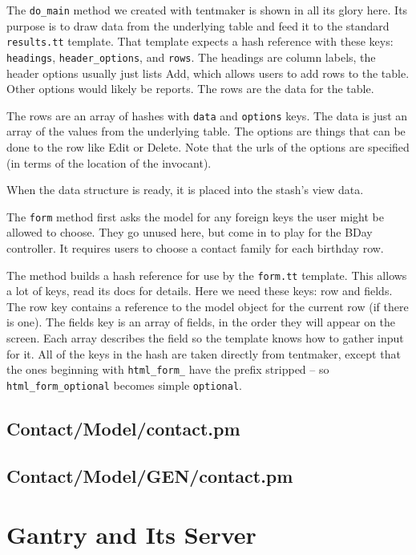 The \verb+do_main+ method we created with tentmaker is shown in all its
glory here.  Its purpose is to draw data from the underlying table
and feed it to the standard \verb+results.tt+ template.  That template expects
a hash reference with these keys: \verb+headings+, \verb+header_options+,
and \verb+rows+.  The headings are column labels, the header options usually
just lists Add, which allows users to add rows to the table.  Other options
would likely be reports.  The rows are the data for the table.

The rows are an array of hashes with \verb+data+ and \verb+options+ keys.
The data is just an array of the values from the underlying table.  The
options are things that can be done to the row like Edit or Delete.
Note that the urls of the options are specified (in terms of the location
of the invocant).

When the data structure is ready, it is placed into the stash's view data.

The \verb+form+ method first asks the model for any foreign keys the
user might be allowed to choose.  They go unused here, but come in to
play for the BDay controller.  It requires users to choose a contact family
for each birthday row.

The method builds a hash reference for use by the \verb+form.tt+ template.
This allows a lot of keys, read its docs for details.  Here we need these
keys: row and fields.  The row key contains a reference to the model object
for the current row (if there is one).  The fields key is an array of
fields, in the order they will appear on the screen.  Each array describes
the field so the template knows how to gather input for it.  All of the
keys in the hash are taken directly from tentmaker, except that the
ones beginning with \verb+html_form_+ have the prefix stripped -- so
\verb+html_form_optional+ becomes simple \verb+optional+.

\subsection*{Contact/Model/contact.pm}

\subsection*{Contact/Model/GEN/contact.pm}

\section{Gantry and Its Server}



